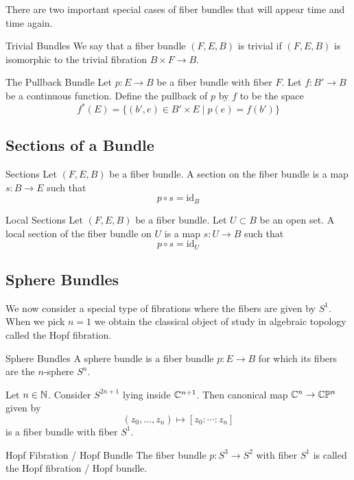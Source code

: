 \documentclass[a4paper]{article}
\begin{document}
There are two important special cases of fiber bundles that will appear time and time again. 

\begin{defn}{Trivial Bundles}{} We say that a fiber bundle $(F,E,B)$ is trivial if $(F,E,B)$ is isomorphic to the trivial fibration $B\times F\to B$. 
\end{defn}

\begin{defn}{The Pullback Bundle}{} Let $p:E\to B$ be a fiber bundle with fiber $F$. Let $f:B'\to B$ be a continuous function. Define the pullback of $p$ by $f$ to be the space $$f^\ast(E)=\{(b',e)\in B'\times E\;|\;p(e)=f(b')\}$$
\end{defn}

\subsection{Sections of a Bundle}
\begin{defn}{Sections}{} Let $(F,E,B)$ be a fiber bundle. A section on the fiber bundle is a map $s:B\to E$ such that $$p\circ s=\text{id}_B$$
\end{defn}

\begin{defn}{Local Sections}{} Let $(F,E,B)$ be a fiber bundle. Let $U\subset B$ be an open set. A local section of the fiber bundle on $U$ is a map $s:U\to B$ such that $$p\circ s=\text{id}_U$$
\end{defn}

\subsection{Sphere Bundles}
We now consider a special type of fibrations where the fibers are given by $S^1$. When we pick $n=1$ we obtain the classical object of study in algebraic topology called the Hopf fibration. 

\begin{defn}{Sphere Bundles}{} A sphere bundle is a fiber bundle $p:E\to B$ for which its fibers are the $n$-sphere $S^n$. 
\end{defn}

\begin{thm}{}{} Let $n\in\mathbb{N}$. Consider $S^{2n+1}$ lying inside $\mathbb{C}^{n+1}$. Then canonical map $\mathbb{C}^n\to\mathbb{C}\mathbb{P}^{n}$ given by $$(z_0,\dots,z_n)\mapsto[z_0:\cdots:z_n]$$ is a fiber bundle with fiber $S^1$. 
\end{thm}

\begin{defn}{Hopf Fibration / Hopf Bundle}{} The fiber bundle $p:S^3\to S^2$ with fiber $S^1$ is called the Hopf fibration / Hopf bundle. 
\end{defn}
\end{document}

